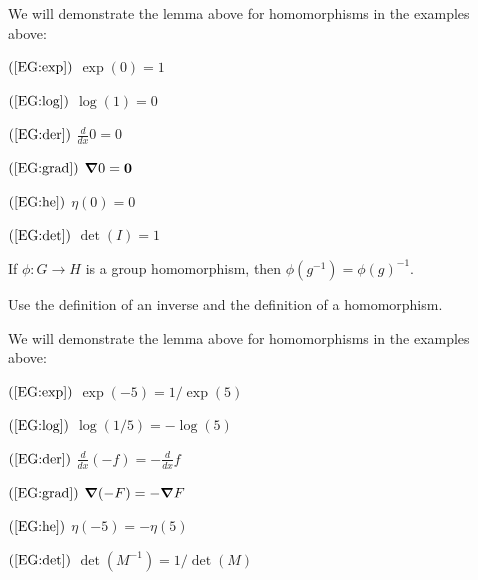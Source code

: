 \documentclass{ximera}
\begin{document}
\begin{example}
  We will demonstrate the lemma above for homomorphisms in the
  examples above:
  \begin{description}
    \begin{multicols}{3}
    \item[$(\ref{EG:exp})$] $\exp(0) = 1$
    \item[$(\ref{EG:log})$] $\log(1) = 0$
    \item[$(\ref{EG:der})$] $\frac{d}{dx}0 = 0$
    \item[$(\ref{EG:grad})$] $\boldsymbol\nabla 0 = \mathbf{0}$
    \item[$(\ref{EG:he})$] $\eta(0) = 0$
    \item[$(\ref{EG:det})$] $\det(I) = 1$
    \end{multicols}
  \end{description}
\end{example}




\begin{lemma}\label{L:HPI}
  If $\phi:G\to H$ is a group homomorphism, then $\phi(g^{-1}) =
  \phi(g)^{-1}$.
  \begin{sketch}
    Use the definition of an inverse and the definition of a
    homomorphism.
  \end{sketch}
\end{lemma}

\begin{example}
  We will demonstrate the lemma above for homomorphisms in the
  examples above:
  \begin{description}
    \begin{multicols}{2}
    \item[$(\ref{EG:exp})$] $\exp(-5) = 1/\exp(5)$
    \item[$(\ref{EG:log})$] $\log(1/5) = -\log(5)$
    \item[$(\ref{EG:der})$] $\frac{d}{dx}(-f) = -\frac{d}{dx}f$
    \item[$(\ref{EG:grad})$] $\boldsymbol\nabla( -F) = -\boldsymbol\nabla F$
    \item[$(\ref{EG:he})$] $\eta(-5) = -\eta( 5)$
    \item[$(\ref{EG:det})$] $\det(M^{-1}) = 1/\det(M)$
    \end{multicols}
  \end{description}
\end{example}
\end{document}
